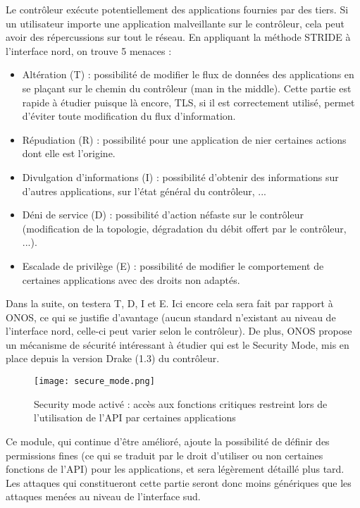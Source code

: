 Le contrôleur exécute potentiellement des applications fournies par des tiers. Si un utilisateur  importe une application malveillante sur le contrôleur, cela peut avoir des répercussions sur tout le réseau.
En appliquant la méthode STRIDE à l'interface nord, on trouve 5 menaces :

\begin{itemize}

\item Altération (T) : possibilité de modifier le flux de données des applications en se plaçant sur le chemin du contrôleur (man in the middle). Cette partie est rapide à étudier puisque là encore, TLS, si il est correctement utilisé, permet d’éviter toute modification du flux d'information.

\item Répudiation (R) : possibilité pour une application de nier certaines actions dont elle est l'origine.

\item Divulgation d'informations (I) : possibilité d’obtenir des informations sur d'autres applications, sur l'état général du contrôleur, ...

\item Déni de service (D) : possibilité d'action néfaste sur le contrôleur (modification de la topologie, dégradation du débit offert par le contrôleur, ...).

\item Escalade de privilège (E) : possibilité de modifier le comportement de certaines applications avec des droits non adaptés.

\end{itemize}

Dans la suite, on testera T, D, I et E. Ici encore cela sera fait par rapport à ONOS, ce qui se justifie d'avantage (aucun standard n'existant au niveau de l'interface nord, celle-ci peut varier selon le contrôleur). De plus, ONOS propose un mécanisme de sécurité intéressant à étudier qui est le Security Mode, mis en place depuis la version Drake (1.3) du contrôleur.

\begin{figure}[h]
  	\centering
  	\texttt{[image: secure\_mode.png]}
  	\caption{Security mode activé : accès aux fonctions critiques restreint lors de l'utilisation de l'API par certaines applications}
\end{figure}

Ce module, qui continue d'être amélioré, ajoute la possibilité de définir des permissions fines (ce qui se traduit par le droit d'utiliser ou non certaines fonctions de l'API) pour les applications, et sera légèrement détaillé plus tard. Les attaques qui constitueront cette partie seront donc moins génériques que les attaques menées au niveau de l'interface sud.
